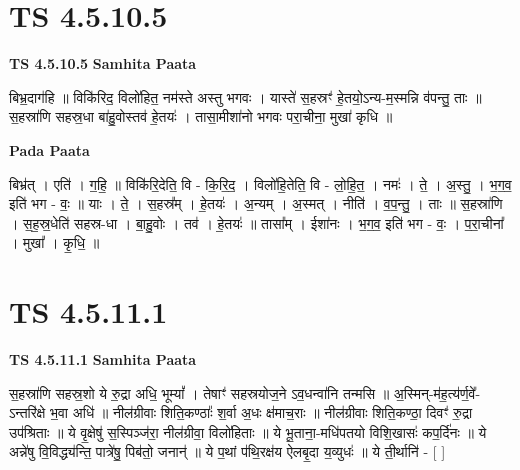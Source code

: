 \documentclass[17pt]{extarticle}
\begin{document}
\section*{ TS 4.5.10.5 }

\textbf{TS 4.5.10.5 } \newline
\textbf{Samhita Paata} \newline

बिभ्र॒दाग॑हि ॥ विकि॑रिद॒ विलो॑हित॒ नम॑स्ते अस्तु भगवः । यास्ते॑ स॒हस्रꣳ॑ हे॒तयो॒ऽन्य-म॒स्मन्नि व॑पन्तु॒ ताः ॥                            स॒हस्रा॑णि सहस्र॒धा बा॑हु॒वोस्तव॑ हे॒तयः॑ । तासा॒मीशा॑नो भगवः परा॒चीना॒ मुखा॑ कृधि ॥ \newline

\textbf{Pada Paata} \newline

बिभ्र॑त् । एति॑ । ग॒हि॒ ॥ विकि॑रि॒देति॒ वि - कि॒रि॒द॒ । विलो॑हि॒तेति॒ वि - लो॒हि॒त॒ । नमः॑ । ते॒ । अ॒स्तु॒ । भ॒ग॒व॒ इति॑ भग - वः॒ ॥ याः । ते॒ । स॒हस्र᳚म् । हे॒तयः॑ । अ॒न्यम् । अ॒स्मत् । नीति॑ । व॒प॒न्तु॒ । ताः ॥ स॒हस्रा॑णि । स॒ह॒स्र॒धेति॑ सहस्र-धा । बा॒हु॒वोः । तव॑ । हे॒तयः॑ ॥ तासा᳚म् । ईशा॑नः । भ॒ग॒व॒ इति॑ भग - वः॒ । प॒रा॒चीना᳚ । मुखा᳚ । कृ॒धि॒ ॥  \newline




\section*{ TS 4.5.11.1 }

\textbf{TS 4.5.11.1 } \newline
\textbf{Samhita Paata} \newline

स॒हस्रा॑णि सहस्र॒शो ये रु॒द्रा अधि॒ भूम्यां᳚ । तेषाꣳ॑ सहस्रयोज॒ने ऽव॒धन्वा॑नि तन्मसि ॥                                      अ॒स्मिन्-म॑ह॒त्य॑र्ण॒वे᳚-ऽन्तरि॑क्षे भ॒वा अधि॑ ॥                                     नील॑ग्रीवाः शिति॒कण्ठाः᳚ श॒र्वा अ॒धः क्ष॑माच॒राः ॥                                नील॑ग्रीवाः शिति॒कण्ठा॒ दिवꣳ॑ रु॒द्रा उप॑श्रिताः ॥                         ये वृ॒क्षेषु॑ स॒स्पिञ्ज॑रा॒ नील॑ग्रीवा॒ विलो॑हिताः ॥                                        ये भू॒ताना॒-मधि॑पतयो विशि॒खासः॑ कप॒र्दि॑नः ॥                                    ये अन्ने॑षु वि॒विद्ध्य॑न्ति॒ पात्रे॑षु॒ पिब॑तो॒ जनान्॑ ॥                                       ये प॒थां प॑थि॒रक्ष॑य ऐलबृ॒दा य॒व्युधः॑ ॥ ये ती॒र्थानि॑ - [  ] \newline
\end{document}
